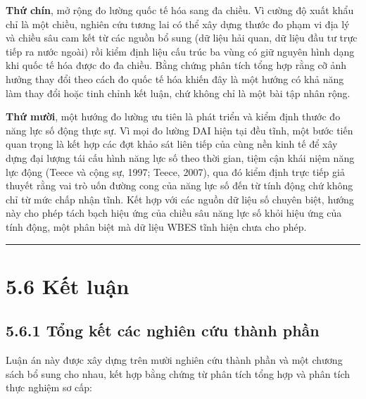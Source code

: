 \documentclass[
  a4paper,
  13pt]{extreport}
\begin{document}
\textbf{Thứ chín}, mở rộng đo lường quốc tế hóa sang đa chiều. Vì cường
độ xuất khẩu chỉ là một chiều, nghiên cứu tương lai có thể xây dựng
thước đo phạm vi địa lý và chiều sâu cam kết từ các nguồn bổ sung (dữ
liệu hải quan, dữ liệu đầu tư trực tiếp ra nước ngoài) rồi kiểm định
liệu cấu trúc ba vùng có giữ nguyên hình dạng khi quốc tế hóa được đo đa
chiều. Bằng chứng phân tích tổng hợp rằng cỡ ảnh hưởng thay đổi theo
cách đo quốc tế hóa khiến đây là một hướng có khả năng làm thay đổi hoặc
tinh chỉnh kết luận, chứ không chỉ là một bài tập nhân rộng.

\textbf{Thứ mười}, một hướng đo lường ưu tiên là phát triển và kiểm định
thước đo năng lực số động thực sự. Vì mọi đo lường DAI hiện tại đều
tĩnh, một bước tiến quan trọng là kết hợp các đợt khảo sát liên tiếp của
cùng nền kinh tế để xây dựng đại lượng tái cấu hình năng lực số theo
thời gian, tiệm cận khái niệm năng lực động (Teece và cộng sự, 1997;
Teece, 2007), qua đó kiểm định trực tiếp giả thuyết rằng vai trò uốn
đường cong của năng lực số đến từ tính động chứ không chỉ từ mức chấp
nhận tĩnh. Kết hợp với các nguồn dữ liệu số chuyên biệt, hướng này cho
phép tách bạch hiệu ứng của chiều sâu năng lực số khỏi hiệu ứng của tính
động, một phân biệt mà dữ liệu WBES tĩnh hiện chưa cho phép.

\begin{center}\rule{0.5\linewidth}{0.5pt}\end{center}

\hypertarget{kux1ebft-luux1eadn}{%
\section{5.6 Kết luận}\label{kux1ebft-luux1eadn}}

\hypertarget{tux1ed5ng-kux1ebft-cuxe1c-nghiuxean-cux1ee9u-thuxe0nh-phux1ea7n}{%
\subsection{5.6.1 Tổng kết các nghiên cứu thành
phần}\label{tux1ed5ng-kux1ebft-cuxe1c-nghiuxean-cux1ee9u-thuxe0nh-phux1ea7n}}

Luận án này được xây dựng trên mười nghiên cứu thành phần và một chương
sách bổ sung cho nhau, kết hợp bằng chứng từ phân tích tổng hợp và phân
tích thực nghiệm sơ cấp:
\end{document}
